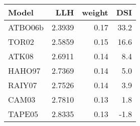 \begin{tabular}{lrrr}
\toprule
   Model &     LLH &  weight &   DSI \\
\midrule
 ATBO06b &  2.3939 &    0.17 &  33.2 \\
   TOR02 &  2.5859 &    0.15 &  16.6 \\
   ATK08 &  2.6911 &    0.14 &   8.4 \\
  HAHO97 &  2.7369 &    0.14 &   5.0 \\
  RAIY07 &  2.7526 &    0.14 &   3.9 \\
   CAM03 &  2.7810 &    0.13 &   1.8 \\
  TAPE05 &  2.8335 &    0.13 &  -1.8 \\
\bottomrule
\end{tabular}
